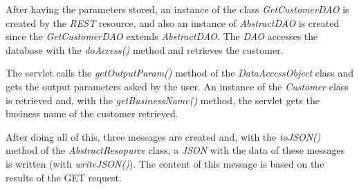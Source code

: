 After having the parameters stored, an instance of the class \textit{GetCustomerDAO} is created by the \textit{REST} resource, and also an instance of \textit{AbstractDAO} is created since the \textit{GetCustomerDAO} extends \textit{AbstractDAO}. The \textit{DAO} accesses the database with the \textit{doAccess()} method and retrieves the customer.

The servlet calls the \textit{getOutputParam()} method of the \textit{DataAccessObject} class and gets the output parameters asked by the user. An instance of the \textit{Customer} class is retrieved and, with the \textit{getBusinessName()} method, the servlet gets the business name of the customer retrieved.

After doing all of this, three messages are created and, with the \textit{toJSON()} method of the \textit{AbstractResopurce} class, a \textit{JSON} with the data of these messages is written (with \textit{writeJSON()}). The content of this message is based on the results of the GET request.
